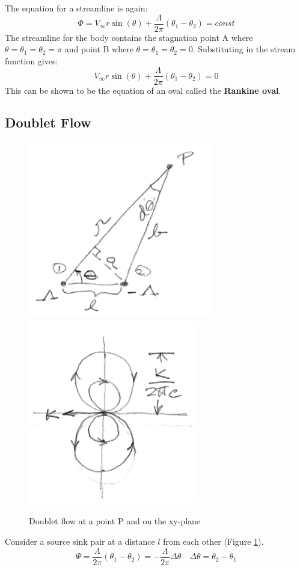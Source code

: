 \documentclass[draft=false, titlepage]{article}
\begin{document}
The equation for a streamline is again:
\begin{equation*}
    \Phi = V_\infty r\sin(\theta) + \frac{\Lambda}{2\pi}(\theta_1-\theta_2) = const
\end{equation*}
The streamline for the body contains the stagnation point A where $\theta = \theta_1 = \theta_2 = \pi$ and point B where $\theta = \theta_1 = \theta_2 = 0$. Substituting in the stream function gives:
\begin{equation*}
    V_\infty r \sin(\theta) + \frac{\Lambda}{2\pi}(\theta_1-\theta_2) = 0
\end{equation*}
This can be shown to be the equation of an oval called the \textbf{Rankine oval}.


\subsection{Doublet Flow}
\begin{figure}[ht]
    \centering
    \includegraphics[width=0.3\linewidth]{Figures/doubletFlow.PNG}
    \includegraphics[width=0.3\linewidth]{Figures/doubletFlow2.PNG}
    \caption{Doublet flow at a point P and on the xy-plane}
    \label{fig:DoubletFlow}
\end{figure}
Consider a source sink pair at a distance $l$ from each other (Figure \ref{fig:DoubletFlow}).
\begin{equation*}
    \Psi = \frac{\Lambda}{2\pi}(\theta_1 - \theta_2) = -\frac{\Lambda}{2\pi}\Delta \theta \quad \Delta \theta = \theta_2-\theta_1
\end{equation*}
\end{document}
